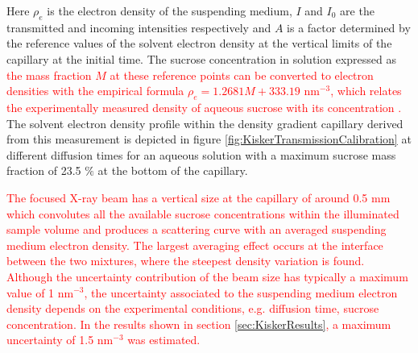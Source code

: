 Here \(\rho_e\) is the electron density of the suspending medium, $I$ and $I_0$ are the transmitted and incoming intensities respectively and $A$ is a factor determined by the reference values of the solvent electron density at the vertical limits of the capillary at the initial time. The sucrose concentration in solution expressed as \textcolor{red}{the mass fraction \( M \) at these reference points can be converted to electron densities with the empirical formula \( \rho_e=1.2681M+333.19 \) nm\(^{-3}\), which relates the experimentally measured density of aqueous sucrose with its concentration \citep{haynes_crc_2012}.} The solvent electron density profile within the density gradient capillary derived from this measurement is depicted in figure \ref{fig:KiskerTransmissionCalibration} at different diffusion times for an aqueous solution with a maximum sucrose mass fraction of 23.5 $\%$ at the bottom of the capillary. 

\textcolor{red}{The focused X-ray beam has a vertical size at the capillary of around 0.5 mm which convolutes all the available sucrose concentrations within the illuminated sample volume and produces a scattering curve with an averaged suspending medium electron density. The largest averaging effect occurs at the interface between the two mixtures, where the steepest density variation is found. Although the uncertainty contribution of the beam size has typically a maximum value of 1 nm$^{-3}$, the uncertainty associated to the suspending medium electron density depends on the experimental conditions, e.g. diffusion time, sucrose concentration. In the results shown in section \ref{sec:KiskerResults}, a maximum uncertainty of 1.5 nm$^{-3}$ was estimated.}




\begin{figure*}%
	\centering
		
		\caption[Calibration of the solvent electron density by X-ray transmission.]{Solvent density along the gradient capillary vertical axis at different diffusion times, calculated from the transmission measurements at 5500 eV \textcolor{red}{of an aqueous solution with a maximum sucrose mass fraction of 23.5 $\%$ at the bottom of the capillary}. The corresponding X-ray transmission is shown on the right axis, revealing the low transmittances of the filled capillary at low energies.}
		\label{fig:KiskerTransmissionCalibration}
\end{figure*}

